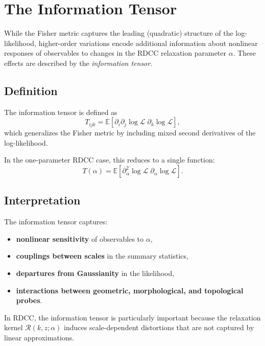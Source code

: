\documentclass[11pt,a4paper]{article}
\begin{document}
\section{The Information Tensor}

While the Fisher metric captures the leading (quadratic) structure of the 
log-likelihood, higher-order variations encode additional information about 
nonlinear responses of observables to changes in the RDCC relaxation parameter 
$\alpha$. These effects are described by the \emph{information tensor}.

\subsection{Definition}

The information tensor is defined as
\begin{equation}
T_{ijk}
=
\mathbb{E}\!\left[
    \partial_i \partial_j \log \mathcal{L} \;
    \partial_k \log \mathcal{L}
\right],
\end{equation}
which generalizes the Fisher metric by including mixed second derivatives of 
the log-likelihood.

In the one-parameter RDCC case, this reduces to a single function:
\begin{equation}
T(\alpha)
=
\mathbb{E}\!\left[
    \partial_\alpha^2 \log \mathcal{L} \;
    \partial_\alpha \log \mathcal{L}
\right].
\end{equation}

\subsection{Interpretation}

The information tensor captures:
\begin{itemize}
    \item \textbf{nonlinear sensitivity} of observables to $\alpha$,
    \item \textbf{couplings between scales} in the summary statistics,
    \item \textbf{departures from Gaussianity} in the likelihood,
    \item \textbf{interactions between geometric, morphological, and topological probes}.
\end{itemize}

In RDCC, the information tensor is particularly important because the 
relaxation kernel $\mathcal{R}(k,z;\alpha)$ induces scale-dependent distortions 
that are not captured by linear approximations.
\end{document}
